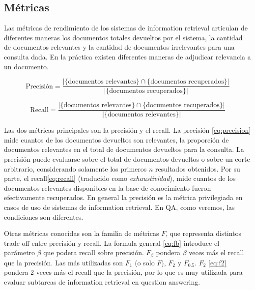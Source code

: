 \subsection{Métricas}
\label{subsec:metricas-ir}
Las métricas de rendimiento de los sistemas de information retrieval articulan de diferentes maneras los documentos totales devueltos por el sistema, la cantidad de documentos relevantes y la cantidad de documentos irrelevantes para una consulta dada. En la práctica existen diferentes maneras de adjudicar relevancia a un documento. 

\begin{equation}\label{eq:precision}
 \mbox{Precisión}=\frac{|\{\mbox{documentos relevantes}\}\cap\{\mbox{documentos recuperados}\}|}{|\{\mbox{documentos recuperados}\}|} 
\end{equation}

\begin{equation}\label{eq:recall}
  \mbox{Recall}=\frac{|\{\mbox{documentos relevantes}\}\cap\{\mbox{documentos recuperados}\}|}{|\{\mbox{documentos relevantes}\}|} 
\end{equation}

\medskip 

Las dos métricas principales son la precisión y el recall.
La precisión \eqref{eq:precision} mide cuantos de los documentos devueltos son relevantes, la proporción de documentos relevantes en el total de documentos devueltos para la consulta. La precisión puede evaluarse sobre el total de documentos devueltos o sobre un corte arbitrario, considerando solamente los primeros $n$  resultados obtenidos. Por su parte, el recall\eqref{eq:recall} (traducido como \textit{exhaustividad}), mide cuantos de los documentos relevantes disponibles en la base de conocimiento fueron efectivamente recuperados. En general la precisión es la métrica privilegiada en casos de uso de sistemas de information retrieval. En QA, como veremos, las condiciones son diferentes.



Otras métricas conocidas son la familia de métricas $F$, que representa distintos trade off entre precisión y recall.
La formula general \eqref{eq:fb} introduce el parámetro $\beta$ que podera recall sobre precisión. $F_\beta$ pondera $\beta$ veces más el recall que la precisión. Las más utilizadas son $F_1$ (o solo $F$), $F_2$ y $F_{0.5}$. $F_2$ \eqref{eq:f2} pondera 2 veces más el recall que la precisión, por lo que es muy utilizada para evaluar subtareas de information retrieval en question answering.

